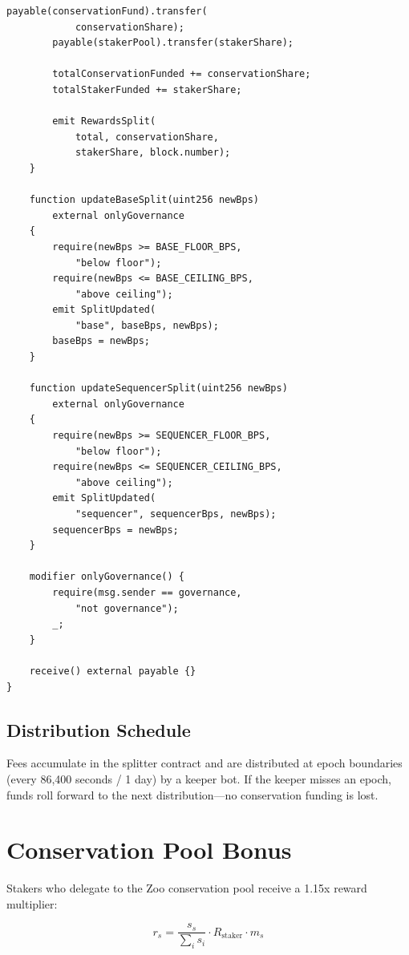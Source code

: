 \documentclass[11pt,letterpaper]{article}
\begin{document}
\begin{lstlisting}[language=Solidity,caption=ConservationFeeSplitter contract]
        payable(conservationFund).transfer(
            conservationShare);
        payable(stakerPool).transfer(stakerShare);

        totalConservationFunded += conservationShare;
        totalStakerFunded += stakerShare;

        emit RewardsSplit(
            total, conservationShare,
            stakerShare, block.number);
    }

    function updateBaseSplit(uint256 newBps)
        external onlyGovernance
    {
        require(newBps >= BASE_FLOOR_BPS,
            "below floor");
        require(newBps <= BASE_CEILING_BPS,
            "above ceiling");
        emit SplitUpdated(
            "base", baseBps, newBps);
        baseBps = newBps;
    }

    function updateSequencerSplit(uint256 newBps)
        external onlyGovernance
    {
        require(newBps >= SEQUENCER_FLOOR_BPS,
            "below floor");
        require(newBps <= SEQUENCER_CEILING_BPS,
            "above ceiling");
        emit SplitUpdated(
            "sequencer", sequencerBps, newBps);
        sequencerBps = newBps;
    }

    modifier onlyGovernance() {
        require(msg.sender == governance,
            "not governance");
        _;
    }

    receive() external payable {}
}
\end{lstlisting}

\subsection{Distribution Schedule}

Fees accumulate in the splitter contract and are distributed at epoch boundaries (every 86{,}400 seconds / 1 day) by a keeper bot. If the keeper misses an epoch, funds roll forward to the next distribution---no conservation funding is lost.

\section{Conservation Pool Bonus}
\label{sec:bonus}

Stakers who delegate to the Zoo conservation pool receive a 1.15x reward multiplier:

\begin{equation}
    r_s = \frac{s_s}{\sum_i s_i} \cdot R_{\text{staker}} \cdot m_s
\end{equation}
\end{document}
